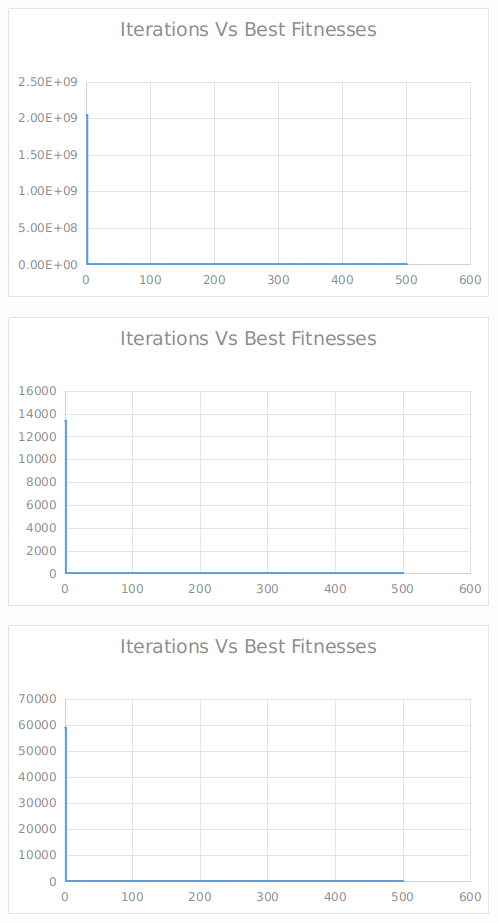 \documentclass[12pt]{article}
\begin{document}
					\begin{minipage}{0.6\linewidth}
						\includegraphics[width=\linewidth]{33.png}
					\end{minipage}
					\hfill
					\begin{minipage}{0.6\linewidth}
						\includegraphics[width=\linewidth]{34.png}
					\end{minipage}
					\begin{minipage}{0.6\linewidth}
						\includegraphics[width=\linewidth]{35.png}
					\end{minipage}
\end{document}
